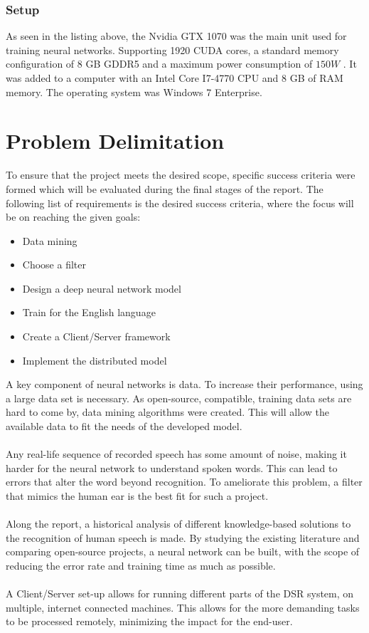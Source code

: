 \subsubsection{Setup}
As seen in the listing above, the Nvidia GTX 1070 was the main unit used for training neural networks.
Supporting 1920 CUDA cores, a standard memory configuration of 8 GB GDDR5 and a maximum power consumption of  $150W$ \cite{GPU}. It was added to a computer with an Intel Core I7-4770 CPU and 8 GB of RAM memory. The operating system was Windows 7 Enterprise.

\section{Problem Delimitation}\label{sec:PD}
To ensure that the project meets the desired scope,
specific success criteria were formed which will be
evaluated during the final stages of the report.
The following list of requirements is the desired
success criteria, where the focus will be on reaching
the given goals:
\begin{itemize}
    \item Data mining
    \item Choose a filter
    \item Design a deep neural network model
    \item Train for the English language
    \item Create a Client/Server framework
    \item Implement the distributed model
\end{itemize}
A key component of neural networks is data. To increase their performance, using a large data set is necessary. As open-source, compatible, training data sets are hard to come by, data mining algorithms were created. This will allow the available data to fit the needs of the developed model.\\\\
Any real-life sequence of recorded speech has some amount of noise, making it harder for the neural network to understand spoken words.
This can lead to errors that alter the word beyond recognition. 
To ameliorate this problem, a filter that mimics the human
ear is the best fit for such a project.\\\\
Along the report, a historical analysis of different knowledge-based solutions to the recognition of human speech is made.
By studying the existing literature and comparing open-source projects, a neural network can be built, with the scope of reducing the error rate and training time as much
as possible.\\\\
A Client/Server set-up allows for running different parts of the DSR system, on multiple, internet connected machines. This allows for the more demanding tasks to be processed remotely, minimizing the impact for the end-user.